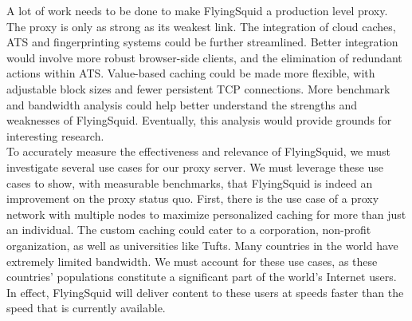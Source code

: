 \noindent
A lot of work needs to be done to make FlyingSquid a production level proxy. The proxy is only as strong as its weakest link. The integration of cloud caches, ATS and fingerprinting systems could be further streamlined. Better integration would involve more robust browser-side clients, and the elimination of redundant actions within ATS. Value-based caching could be made more flexible, with adjustable block sizes and fewer persistent TCP connections. More benchmark and bandwidth analysis could help better understand the strengths and weaknesses of FlyingSquid. Eventually, this analysis would provide grounds for interesting research.\\

\noindent
To accurately measure the effectiveness and relevance of FlyingSquid, we must investigate several use cases for our proxy server. We must leverage these use cases to show, with measurable benchmarks, that FlyingSquid is indeed an improvement on the proxy status quo. First, there is the use case of a proxy network with multiple nodes to maximize personalized caching for more than just an individual. The custom caching could cater to a corporation, non-profit organization, as well as universities like Tufts. 
Many countries in the world have extremely limited bandwidth. We must account for these use cases, as these countries’ populations constitute a significant part of the world’s Internet users. In effect, FlyingSquid will deliver content to these users at speeds faster than the speed that is currently available.








